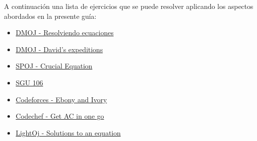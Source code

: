 A continuación una lista de ejercicios que se puede resolver aplicando los aspectos abordados en la presente guía:

\begin{itemize}
	\item \href{https://dmoj.uclv.edu.cu/problem/ecuation}{DMOJ - Resolviendo ecuaciones}
	\item \href{https://dmoj.uclv.edu.cu/problem/expedition}{DMOJ - David's expeditions}
	\item \href{http://www.spoj.com/problems/CEQU/}{SPOJ - Crucial Equation}
	\item \href{http://codeforces.com/problemsets/acmsguru/problem/99999/106}{SGU 106}
	\item \href{http://codeforces.com/contest/633/problem/A}{Codeforces - Ebony and Ivory}
	\item \href{https://www.codechef.com/problems/COPR16G}{Codechef - Get AC in one go}
	\item \href{http://www.lightoj.com/volume_showproblem.php?problem=1306}{LightOj - Solutions to an equation}
\end{itemize}